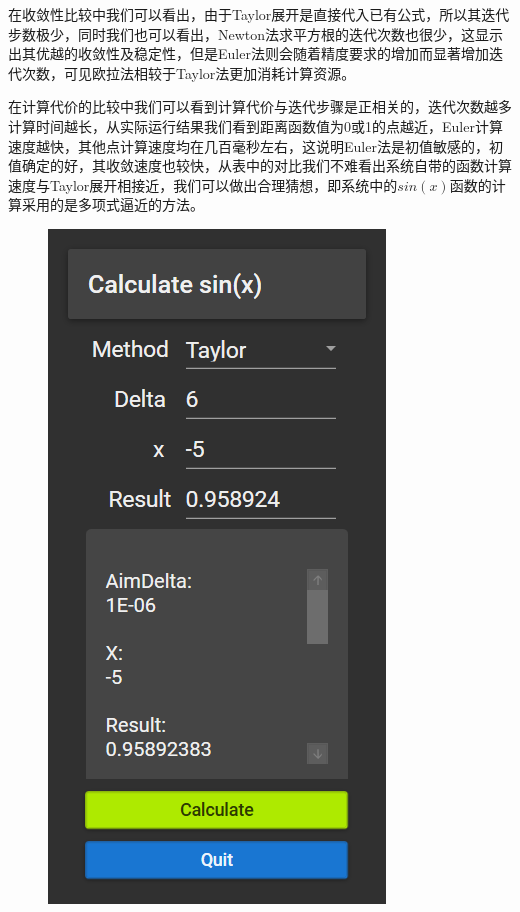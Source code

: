 \documentclass[lang=cn,11pt,a4paper]{elegantpaper}
\begin{document}
在收敛性比较中我们可以看出，由于Taylor展开是直接代入已有公式，所以其迭代步数极少，同时我们也可以看出，Newton法求平方根的迭代次数也很少，这显示出其优越的收敛性及稳定性，但是Euler法则会随着精度要求的增加而显著增加迭代次数，可见欧拉法相较于Taylor法更加消耗计算资源。

在计算代价的比较中我们可以看到计算代价与迭代步骤是正相关的，迭代次数越多计算时间越长，从实际运行结果我们看到距离函数值为0或1的点越近，Euler计算速度越快，其他点计算速度均在几百毫秒左右，这说明Euler法是初值敏感的，初值确定的好，其收敛速度也较快，从表中的对比我们不难看出系统自带的函数计算速度与Taylor展开相接近，我们可以做出合理猜想，即系统中的$sin(x)$函数的计算采用的是多项式逼近的方法。

\begin{figure}[htbp]
  \begin{minipage}[htbp]{0.4\linewidth}
    \centering
    \includegraphics[width=0.8\linewidth]{src/E.png}

\end{minipage}
\end{figure}
\end{document}
